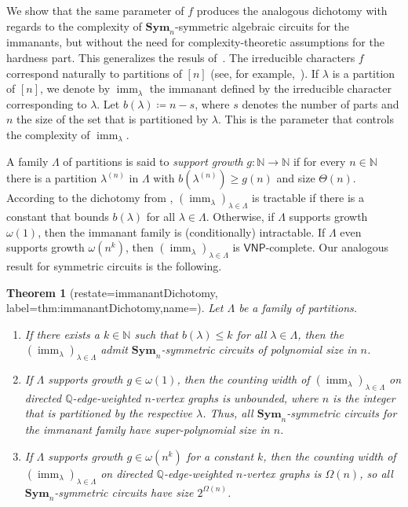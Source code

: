 \documentclass[11pt, DIV=15]{scrarticle}
\theoremstyle{definition}
\theoremstyle{plain}
\newtheorem{theorem}[definition]{Theorem}
\theoremstyle{remark}
\newcommand{\Sym}{\mathbf{Sym}}
\newcommand{\bbN}{\mathbb{N}}
\newcommand{\bbQ}{\mathbb{Q}}
\DeclareMathOperator{\imm}{imm}
\newcommand{\VNP}{\mathsf{VNP}}
\begin{document}
We show that the same parameter of $f$ produces the analogous
dichotomy with regards to the complexity of $\Sym_n$-symmetric
algebraic circuits for the immanants, but without the need for
complexity-theoretic assumptions for the hardness part.  This
generalizes the resuls of~\cite{dawar_symmetric_2025}.
The irreducible characters $f$ correspond naturally to partitions
of $[n]$ (see, for example,~\cite[Prop.~1.10.1]{Sagan}).  If $\lambda$ is a partition of $[n]$, we denote by $\imm_{\lambda}$ the immanant defined by the irreducible character corresponding to $\lambda$.
Let $b(\lambda) \coloneqq n-s$, where $s$ denotes the number of parts and $n$ the size of the set that is partitioned by $\lambda$. This is the parameter that controls the complexity of $\imm_{\lambda}$.

A family $\Lambda$ of partitions is said to \emph{support growth} $g \colon \bbN \to \bbN$ if for every $n \in \bbN$ there is a partition $\lambda^{(n)}$ in $\Lambda$ with $b(\lambda^{(n)}) \geq g(n)$ and size $\Theta(n)$. According to the dichotomy from \cite{curticapean2021full}, $(\imm_{\lambda})_{\lambda \in \Lambda}$ is tractable if there is a constant that bounds $b(\lambda)$ for all $\lambda \in \Lambda$. Otherwise, if $\Lambda$ supports growth $\omega(1)$, then the immanant family is (conditionally) intractable. If $\Lambda$ even supports growth $\omega(n^k)$, then $(\imm_{\lambda})_{\lambda \in \Lambda}$ is $\VNP$-complete.
Our analogous result for symmetric circuits is the following.
\begin{theorem}[restate=immanantDichotomy, label=thm:immanantDichotomy,name=]
	Let $\Lambda$ be a family of partitions.
	\begin{enumerate}
		\item If there exists a $k \in \bbN$ such that $b(\lambda) \leq k$ for all $\lambda \in \Lambda$, then the $(\imm_{\lambda})_{\lambda \in \Lambda}$ admit $\Sym_n$-symmetric circuits of polynomial size in $n$.
		\item If $\Lambda$ supports growth $g \in \omega(1)$, then the counting width of $(\imm_{\lambda})_{\lambda \in \Lambda}$ on directed $\bbQ$-edge-weighted $n$-vertex graphs is unbounded, where $n$ is the integer that is partitioned by the respective $\lambda$.
		Thus, all $\Sym_n$-symmetric circuits for the immanant family have super-polynomial size in $n$. 
		\item If $\Lambda$ supports growth $g \in \omega(n^k)$ for a constant $k$, then the counting width of $(\imm_{\lambda})_{\lambda \in \Lambda}$ on directed $\bbQ$-edge-weighted $n$-vertex graphs is $\Omega(n)$, so all $\Sym_n$-symmetric circuits have size $2^{\Omega(n)}$.
	\end{enumerate}	
\end{theorem}	
	
\end{document}
